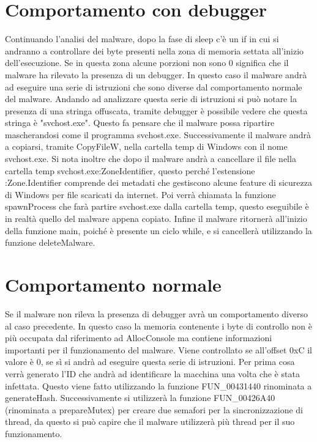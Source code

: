 \documentclass[a4paper,12pt]{article}
\begin{document}
\section{Comportamento con debugger}
Continuando l'analisi del malware, dopo la fase di sleep c'è un if in cui si andranno a controllare dei byte presenti nella zona di memoria settata all'inizio dell'esecuzione. Se in questa zona alcune porzioni non sono 0 significa che il malware ha rilevato la presenza di un debugger. In questo caso il malware andrà ad eseguire una serie di istruzioni che sono diverse dal comportamento normale del malware. Andando ad analizzare questa serie di istruzioni si può notare la presenza di una stringa offuscata, tramite debugger è possibile vedere che questa stringa è "svchost.exe". Questo fa pensare che il malware possa ripartire mascherandosi come il programma svchost.exe. 
Successivamente il malware andrà a copiarsi, tramite CopyFileW, nella cartella temp di Windows con il nome svchost.exe.
Si nota inoltre che dopo il malware andrà a cancellare il file nella cartella temp svchost.exe:ZoneIdentifier, questo perché l'estensione :Zone.Identifier comprende dei metadati che gestiscono alcune feature di sicurezza di Windows per file scaricati da internet. 
Poi verrà chiamata la funzione spawnProcess che farà partire svchost.exe dalla cartella temp, questo eseguibile è in realtà quello del malware appena copiato.  Infine il malware ritornerà all'inizio della funzione main, poiché è presente un ciclo while, e si cancellerà utilizzando la funzione deleteMalware.

\section{Comportamento normale}
Se il malware non rileva la presenza di debugger avrà un comportamento diverso al caso precedente. In questo caso la memoria contenente i byte di controllo non è più occupata dal riferimento ad AllocConsole ma contiene informazioni importanti per il funzionamento del malware. Viene controllato se all'offset 0xC il valore è 0, se sì si andrà ad eseguire questa serie di istruzioni. 
Per prima cosa verrà generato l'ID che andrà ad identificare la macchina una volta che è stata infettata. Questo viene fatto utilizzando la funzione FUN\_00431440 rinominata a generateHash. Successivamente si utilizzerà la funzione FUN\_00426A40 (rinominata a prepareMutex) per creare due semafori per la sincronizzazione di thread, da questo si può capire che il malware utilizzerà più thread per il suo funzionamento. 
\end{document}
